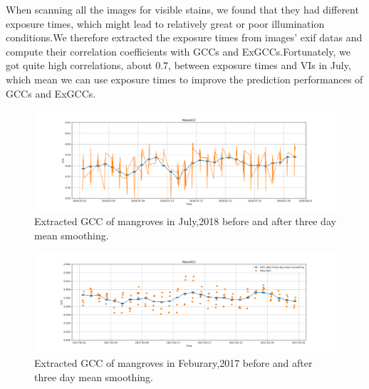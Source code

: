 \documentclass{article}
\begin{document}
When scanning all the images for visible stains, we found that they had different exposure times, which might lead to relatively great or poor illumination conditions.We therefore extracted the exposure times from images' exif datas and compute their correlation  coefficients with GCCs and ExGCCs.Fortunately, we got quite high correlations, about 0.7, between exposure times and VIs in July, which mean we can use exposure times to improve the prediction performances of GCCs and ExGCCs.
\begin{figure}
  \centering
  \includegraphics[width=1\textwidth]{pictures/meanGCC.png}
  \caption{Extracted GCC of mangroves in July,2018 before and after three day mean smoothing.}
  \label{fig:fig1}
\end{figure}

\begin{figure}
  \centering
  \includegraphics[width=1\textwidth]{pictures/FebmeanGCC.png}
  \caption{Extracted GCC of mangroves in Feburary,2017 before and after three day mean smoothing.}
  \label{fig:fig2}
\end{figure}
\end{document}
